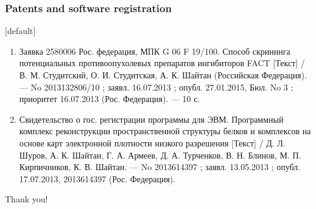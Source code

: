 \normalsize
\begin{frame}
\frametitle{Patents and software registration}
[default]
\begin{enumerate}
    \justifying
  \item Заявка 2580006 Рос. федерация, МПК G 06 F 19/100. Способ скрининга потенциальных противоопухолевых препаратов ингибиторов FACT [Текст] / В. М. Студитский, О. И. Студитская, А. К. Шайтан (Российская Федерация). — No 2013132806/10 ; заявл. 16.07.2013 ; опубл. 27.01.2015, Бюл. No 3 ; приоритет 16.07.2013 (Рос. Федерация). — 10 с.
\item Свидетельство о гос. регистрации программы для ЭВМ. Программный комплекс реконструкции пространственной структуры белков и комплексов на основе карт электронной плотности низкого разрешения [Текст] / Д. Л. Шуров, А. К. Шайтан, Г. А. Армеев, Д. А. Турченков, В. Н. Блинов, М. П. Кирпичников, К. В. Шайтан. — No 2013614397 ; заявл. 13.05.2013 ; опубл. 17.07.2013, 2013614397 (Рос. Федерация).
\end{enumerate}
\end{frame}


\begin{frame} %
    \begin{center}
        \Huge
        Thank you!
    \end{center}
\end{frame}
